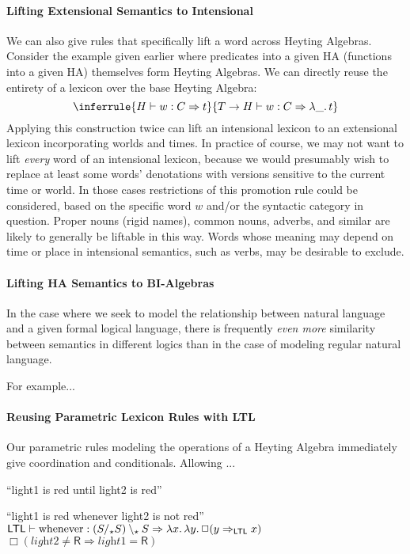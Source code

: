 \documentclass[11pt,a4paper,acceptedWithA]{article}
\begin{document}
\paragraph{Lifting Extensional Semantics to Intensional}
We can also give rules that specifically lift a word across Heyting Algebras. Consider the example given earlier where predicates into a given HA (functions into a given HA) themselves form Heyting Algebras. We can directly reuse the entirety of a lexicon over the base Heyting Algebra:
\[
\inferrule{H\vdash w : C \Rightarrow t}{T\rightarrow H\vdash w : C \Rightarrow \lambda \_\ldotp t}
\]
Applying this construction twice can lift an intensional lexicon to an extensional lexicon incorporating worlds and times.
In practice of course, we may not want to lift \emph{every} word of an intensional lexicon, because we would presumably wish to replace at least some words' denotations with versions sensitive to the current time or world. In those cases restrictions of this promotion rule could be considered, based on the specific word $w$ and/or the syntactic category in question. Proper nouns (rigid names), common nouns, adverbs, and similar are likely to generally be liftable in this way. Words whose meaning may depend on time or place in intensional semantics, such as verbs, may be desirable to exclude.

\paragraph{Lifting HA Semantics to BI-Algebras}
In the case where we seek to model the relationship between natural language and a given formal logical language, there is frequently \emph{even more} similarity between semantics in different logics than in the case of modeling regular natural language.

For example...

\paragraph{Reusing Parametric Lexicon Rules with LTL}
Our parametric rules modeling the operations of a Heyting Algebra immediately give coordination and conditionals.
Allowing ...

``light1 is red until light2 is red''

``light1 is red whenever light2 is not red''\\
$\mathsf{LTL}\vdash \textrm{whenever} : (S/_\star S)\setminus_\star S \Rightarrow \lambda x\ldotp\lambda y\ldotp \Box(y\Rightarrow_\mathsf{LTL} x) $\\
$\Box(\textit{light2}\neq\mathsf{R}\Rightarrow\textit{light1}=\mathsf{R})$
\end{document}

